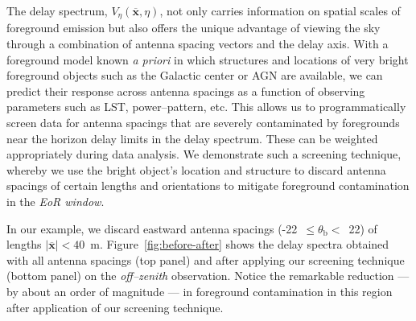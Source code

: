 \documentclass[preprint2,iop,numberedappendix]{emulateapj}
\begin{document}
The delay spectrum, $V_\eta(\overline{\mathbf{x}},\eta)$, not only carries information on spatial scales of foreground emission but also offers the unique advantage of viewing the sky through a combination of antenna spacing vectors and the delay axis. With a foreground model known {\it a priori} in which structures and locations of very bright foreground objects such as the Galactic center or AGN are available, we can predict their response across antenna spacings as a function of observing parameters such as LST, power--pattern, etc. This allows us to programmatically screen data for antenna spacings that are severely contaminated by foregrounds near the horizon delay limits in the delay spectrum. These can be weighted appropriately during data analysis. We demonstrate such a screening technique, whereby we use the bright object's location and structure to discard antenna spacings of certain lengths and orientations to mitigate foreground contamination in the {\it EoR window}. 

In our example, we discard eastward antenna spacings (-22~$\le\theta_\textrm{b}<$~22) of lengths $|\overline{\mathbf{x}}| < 40$~m. Figure~\ref{fig:before-after} shows the delay spectra obtained with all antenna spacings (top panel) and after applying our screening technique (bottom panel) on the {\it off--zenith} observation. Notice the remarkable reduction --- by about an order of magnitude --- in foreground contamination in this region after application of our screening technique. 
\end{document}
